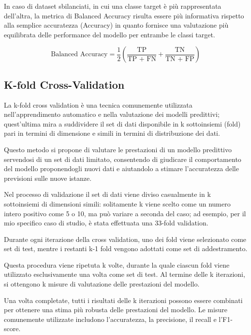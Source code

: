 In caso di dataset sbilanciati, in cui una classe target è più rappresentata dell'altra, la metrica di Balanced Accuracy risulta essere più informativa rispetto alla semplice accuratezza (Accuracy) in quanto fornisce una valutazione più equilibrata delle performance del modello per entrambe le classi target.

\begin{equation}
    \text{Balanced Accuracy} = \frac{1}{2} \left( \frac{\text{TP}}{\text{TP + FN}} + \frac{\text{TN}}{\text{TN + FP}} \right)
    \label{equation:18}
\end{equation}

\subsection{K-fold Cross-Validation}
La k-fold cross validation è una tecnica comunemente utilizzata nell'apprendimento automatico e nella valutazione dei modelli predittivi; quest’ultima mira a suddividere il set di dati disponibile in k sottoinsiemi (fold) pari in termini di dimensione e simili in termini di distribuzione dei dati. 

Questo metodo si propone di valutare le prestazioni di un modello predittivo servendosi di un set di dati limitato, consentendo di giudicare il comportamento del modello proponendogli nuovi dati e aiutandolo a stimare l'accuratezza delle previsioni sulle nuove istanze.

Nel processo di validazione il set di dati viene diviso casualmente in k sottoinsiemi di dimensioni simili: solitamente k viene scelto come un numero intero positivo come 5 o 10, ma può variare a seconda del caso; ad esempio, per il mio specifico caso di studio, è stata effettuata una 33-fold validation.

Durante ogni iterazione della cross validation, uno dei fold viene selezionato come set di test, mentre i restanti k-1 fold vengono adottati come set di addestramento. 

Questa procedura viene ripetuta k volte, durante la quale ciascun fold viene utilizzato esclusivamente una volta come set di test. Al termine delle k iterazioni, si ottengono k misure di valutazione delle prestazioni del modello.

Una volta completate, tutti i risultati delle k iterazioni possono essere combinati per ottenere una stima più robusta delle prestazioni del modello. Le misure comunemente utilizzate includono l'accuratezza, la precisione, il recall e l'F1-score.

